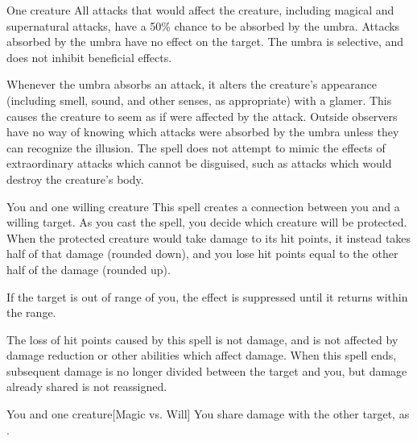 \spellrng{\rngclose}
\spelldur{\durshort}
\begin{spelltarget}{One creature}
    \spelleffect All attacks that would affect the creature, including magical and supernatural attacks, have a 50\% chance to be absorbed by the umbra. Attacks absorbed by the umbra have no effect on the target. The umbra is selective, and does not inhibit beneficial effects.

    Whenever the umbra absorbs an attack, it alters the creature's appearance (including smell, sound, and other senses, as appropriate) with a glamer. This causes the creature to seem as if were affected by the attack. Outside observers have no way of knowing which attacks were absorbed by the umbra unless they can recognize the illusion. The spell does not attempt to mimic the effects of extraordinary attacks which cannot be disguised, such as attacks which would destroy the creature's body.
\end{spelltarget}

\spellrng{\rngmed}
\spelldur{\durlong \dismissable}
\begin{spelltargets}{You and one willing creature}
    \spelleffect This spell creates a connection between you and a willing target. As you cast the spell, you decide which creature will be protected. When the protected creature would take damage to its hit points, it instead takes half of that damage (rounded down), and you lose hit points equal to the other half of the damage (rounded up).

    If the target is out of range of you, the effect is suppressed until it returns within the range.
\end{spelltargets}
\spellnotes The loss of hit points caused by this spell is not damage, and is not affected by damage reduction or other abilities which affect damage. When this spell ends, subsequent damage is no longer divided between the target and you, but damage already shared is not reassigned.

\spellrng{\rngmed}
\spelldur{\durlong \dismissable}
\begin{spelltargets}{You and one creature}[Magic vs. Will]
    \spellsuccess You share damage with the other target, as .
\end{spelltargets}

